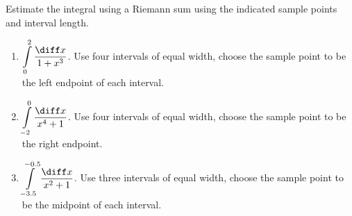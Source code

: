 Estimate the integral using a Riemann sum using the indicated sample points and interval length.
\begin{enumerate}[ref={\fcProblemRef}]
\item $\displaystyle \int\limits_0^2 \frac{\diff x}{1+x^3}$. Use four intervals of equal width, choose the sample point to be the left endpoint of each interval. 


\item $\displaystyle \int\limits_{-2}^{0} \frac{\diff x}{x^4+1} $. Use four intervals of equal width, choose the sample point to be the right endpoint. 


\item\label{problemRiemannSum-1div1plusxsquared} $\displaystyle \int\limits_{-3.5}^{-0.5} \frac{\diff x}{x^2+1} $. Use three intervals of equal width, choose the sample point to be the midpoint of each interval. 


\end{enumerate}


